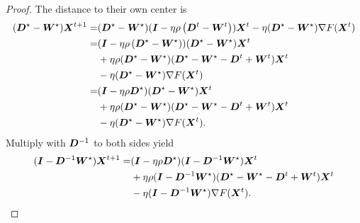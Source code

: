 \documentclass{article}
\begin{document}
\begin{proof}
The distance to their own center is
\begin{align*}
  (\bm{D}^{\star} - \bm{W}^\star) \bm{X}^{t+1}
  = & (\bm{D}^\star - \bm{W}^\star)(\bm{I} - \eta\rho \left( \bm{D}^t - \bm{W}^t \right)) \bm{X}^t
  -\eta(\bm{D}^\star - \bm{W}^\star) \nabla F(\bm{X}^t) \\
  = & (\bm{I} - \eta\rho \left( \bm{D}^\star - \bm{W}^\star \right)) (\bm{D}^\star - \bm{W}^\star) \bm{X}^t \\
  & + \eta\rho(\bm{D}^\star - \bm{W}^\star)(\bm{D}^\star - \bm{W}^\star - \bm{D}^t + \bm{W}^t) \bm{X}^t \\
  & -\eta(\bm{D}^\star - \bm{W}^\star) \nabla F(\bm{X}^t) \\
  = & (\bm{I} - \eta\rho \bm{D}^\star ) (\bm{D}^\star - \bm{W}^\star) \bm{X}^t \\
  & + \eta\rho(\bm{D}^\star - \bm{W}^\star)(\bm{D}^\star - \bm{W}^\star - \bm{D}^t + \bm{W}^t) \bm{X}^t \\
  & -\eta(\bm{D}^\star - \bm{W}^\star) \nabla F(\bm{X}^t).
  \end{align*}
Multiply with $\bm{D}^{-1}$ to both sides yield
\begin{align*}
  (\bm{I} - \bm{D}^{-1}\bm{W}^\star) \bm{X}^{t+1}
  = & (\bm{I} - \eta\rho \bm{D}^\star ) (\bm{I} - \bm{D}^{-1}\bm{W}^\star) \bm{X}^t \\
  & + \eta\rho(\bm{I} - \bm{D}^{-1}\bm{W}^\star)(\bm{D}^\star - \bm{W}^\star - \bm{D}^t + \bm{W}^t) \bm{X}^t \\
  & -\eta(\bm{I} - \bm{D}^{-1}\bm{W}^\star) \nabla F(\bm{X}^t).
\end{align*}



\end{proof}
\end{document}
